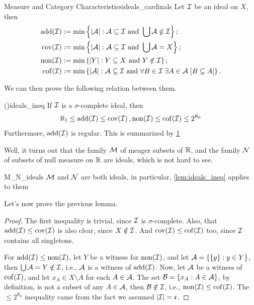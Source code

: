 \begin{definition}{Measure and Category Characteristics}{ideals_cardinals}
Let $\mathcal{I}$ be an ideal on $X$, then
    \begin{align*}
        \mathrm{add}\!\left(\mathcal{I}\right) & := \min\left\{\lvert\mathcal{A}\rvert:\mathcal{A}\subseteq\mathcal{I}\text{ and }\bigcup\mathcal{A}\notin\mathcal{I}\right\};\\
        \mathrm{cov}\!\left(\mathcal{I}\right) & := \min\left\{\lvert\mathcal{A}\rvert:\mathcal{A}\subseteq\mathcal{I}\text{ and }\bigcup\mathcal{A}=X\right\};\\
        \mathrm{non}\!\left(\mathcal{I}\right) & := \min\left\{\lvert Y\rvert:Y\subseteq X\text{ and }Y\notin\mathcal{I}\right\};\\
        \mathrm{cof}\!\left(\mathcal{I}\right) & := \min\left\{\lvert\mathcal{A}\rvert:\mathcal{A}\subseteq\mathcal{I}\text{ and }\forall B\in\mathcal{I}\;\exists A\in\mathcal{A}\;[B\subseteq A]\right\}.
    \end{align*}
\end{definition}

We can then prove the following relation between them.

\begin{lemma}{(\cite{bartoszynsky})}{ideals_ineq}
    If $\mathcal{I}$ is a $\sigma$-complete ideal, then
    $$\aleph_1\leq\mathrm{add}\!\left(\mathcal{I}\right)\leq\mathrm{cov}\!\left(\mathcal{I}\right),\mathrm{non}\!\left(\mathcal{I}\right)\leq\mathrm{cof}\!\left(\mathcal{I}\right)\leq2^{\aleph_0}$$
    Furthermore, $\mathrm{add}\!\left(\mathcal{I}\right)$ is regular. This is summarized by \cref{fig:ideals_diagram}
\end{lemma}

\begin{figure}[ht]
\centering

\caption{}
\label{fig:ideals_diagram}
\end{figure}

Well, it turns out that the family $\mathcal{M}$ of meager subsets of $\mathbb{R}$, and the family $\mathcal{N}$ of subsets of null measure on $\mathbb{R}$ are ideals, which is not hard to see.

\begin{corollary}{}{M_N_ideals}
    $\mathcal{M}$ and $\mathcal{N}$ are both ideals, in particular, \cref{lem:ideals_ineq} applies to them
\end{corollary}

Let's now prove the previous lemma.

\begin{proof}
    The first inequality is trivial, since $\mathcal{I}$ is $\sigma$-complete. Also, that $\mathrm{add}\!\left(\mathcal{I}\right)\leq\mathrm{cov}\!\left(\mathcal{I}\right)$ is also clear, since $X\notin\mathcal{I}$. And $\mathrm{cov}\!\left(\mathcal{I}\right)\leq\mathrm{cof}\!\left(\mathcal{I}\right)$ too, since $\mathcal{I}$ contains all singletons.
    
    For $\mathrm{add}\!\left(\mathcal{I}\right)\leq\mathrm{non}\!\left(\mathcal{I}\right)$, let $Y$ be a witness for $\mathrm{non}\!\left(\mathcal{I}\right)$, and let $\mathcal{A}=\{\{y\}:y\in Y\}$, then $\bigcup\mathcal{A}=Y\notin\mathcal{I}$, i.e., $\mathcal{A}$ is a witness of $\mathrm{add}\!\left(\mathcal{I}\right)$. Now, let $\mathcal{A}$ be a witness of $\mathrm{cof}\!\left(\mathcal{I}\right)$, and let $x_A\in X\setminus A$ for each $A\in\mathcal{A}$. The set $\mathcal{B}=\{x_A:A\in\mathcal{A}\}$, by definition, is not a subset of any $A\in\mathcal{A}$, then $\mathcal{B}\notin\mathcal{I}$, i.e., $\mathrm{non}\!\left(\mathcal{I}\right)\leq\mathrm{cof}\!\left(\mathcal{I}\right)$. The $\leq2^{\aleph_0}$ inequality came from the fact we assumed $\lvert\mathcal{I}\vert=\mathfrak{c}$.
\end{proof}

